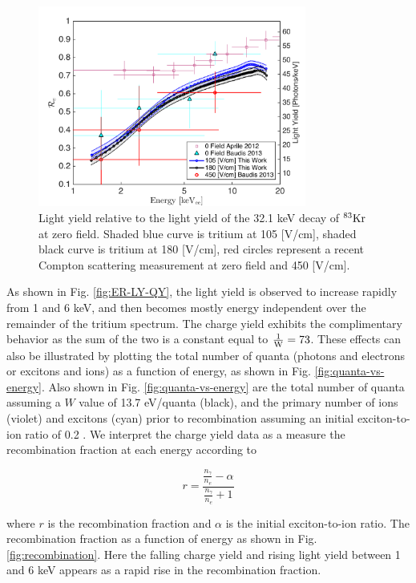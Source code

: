  \begin{figure}[h!]\centering
\includegraphics[width=88mm]{fig/Re_LY_log.png}
\caption{Light yield relative to the light yield of the 32.1 keV decay of $\rm^{83}Kr $ at zero field. Shaded blue curve is tritium at 105 [V/cm], shaded black curve is tritium at 180 [V/cm], red circles represent a recent Compton scattering measurement at zero field and 450 [V/cm]. }
\label{fig:Re_LY}
\end{figure}


As shown in Fig. \ref{fig:ER-LY-QY}, the light yield is observed to increase rapidly from 1 and 6 keV, and then becomes mostly energy independent over the remainder of the tritium spectrum. The charge yield exhibits the complimentary behavior as the sum of the two is a constant equal to $\rm \frac{1}{W}=73$. These effects can also be illustrated by plotting the total number of quanta (photons and electrons or excitons and ions) as a function of energy, as shown in Fig. \ref{fig:quanta-vs-energy}. Also shown in Fig. \ref{fig:quanta-vs-energy} are the total number of quanta assuming a $W$ value of 13.7 eV/quanta (black), and the primary number of ions (violet) and excitons (cyan) prior to recombination assuming an initial exciton-to-ion ratio of 0.2 \cite{alpha-value}. We interpret the charge yield data as a measure the recombination fraction at each energy according to

\begin{displaymath}
r = \frac{\frac{n_{\gamma}}{n_e} - \alpha}{\frac{n_{\gamma}}{n_e} + 1}
\end{displaymath}

\noindent
where $r$ is the recombination fraction and $\alpha$ is the initial exciton-to-ion ratio. The recombination fraction as a function of energy as shown in Fig. \ref{fig:recombination}. Here the falling charge yield and rising light yield between 1 and 6 keV appears as a rapid rise in the recombination fraction. 


